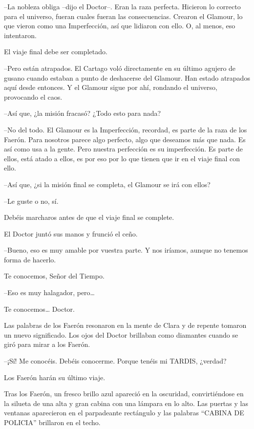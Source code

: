 {--La nobleza obliga --dijo el Doctor--. Eran la raza perfecta. Hicieron
 lo correcto para el universo, fueran cuales fueran las consecuencias.
 Crearon el Glamour, lo que vieron como una Imperfección, así que
lidiaron con ello. O, al menos, eso intentaron.}

{El viaje final debe ser completado.}

{--Pero están atrapados. El Cartago voló directamente en su último
 agujero de gusano cuando estaban a punto de deshacerse del Glamour. Han
 estado atrapados aquí desde entonces. Y el Glamour sigue por ahí,
rondando el universo, provocando el caos.}

{--Así que, ¿la misión fracasó? ¿Todo esto para nada?}

{--No del todo. El Glamour es la Imperfección, recordad, es parte de la
 raza de los Faerón. Para nosotros parece algo perfecto, algo que
 deseamos más que nada. Es así como usa a la gente. Pero nuestra
 perfección es su imperfección. Es parte de ellos, está atado a ellos, es
por eso por lo que tienen que ir en el viaje final con ello.}

{--Así que, ¿si la misión final se completa, el Glamour se irá con
ellos?}

{--Le guste o no, sí.}

{Debéis marcharos antes de que el viaje final se complete.}

{El Doctor juntó sus manos y frunció el ceño.}

{--Bueno, eso es muy amable por vuestra parte. Y nos iríamos, aunque no
tenemos forma de hacerlo.}

{Te conocemos, Señor del Tiempo.}

{--Eso es muy halagador, pero\ldots{}}

{Te conocemos\ldots{} Doctor.}

{Las palabras de los Faerón resonaron en la mente de Clara y de repente
 tomaron un nuevo significado. Los ojos del Doctor brillaban como
diamantes cuando se giró para mirar a los Faerón.}

{--¡Sí! Me conocéis. Debéis conocerme. Porque tenéis mi TARDIS,
¿verdad?}

{Los Faerón harán su último viaje.}

{Tras los Faerón, un fresco brillo azul apareció en la oscuridad,
 convirtiéndose en la silueta de una alta y gran cabina con una lámpara
 en lo alto. Las puertas y las ventanas aparecieron en el parpadeante
rectángulo y las palabras ``CABINA DE POLICIA'' brillaron en el techo.}

